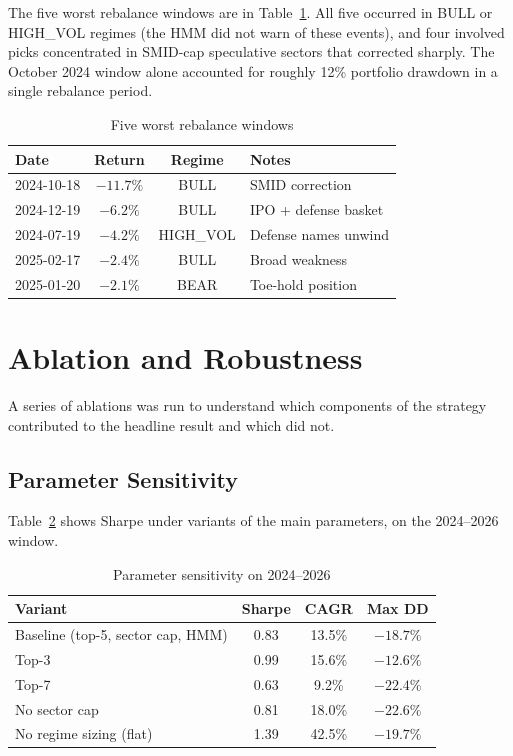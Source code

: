 \documentclass[conference]{IEEEtran}
\begin{document}
The five worst rebalance windows are in Table~\ref{tab:worst}. All five occurred in BULL or HIGH\_VOL regimes (the HMM did not warn of these events), and four involved picks concentrated in SMID-cap speculative sectors that corrected sharply. The October 2024 window alone accounted for roughly 12\% portfolio drawdown in a single rebalance period.

\begin{table}[htbp]
\caption{Five worst rebalance windows}
\label{tab:worst}
\centering
\footnotesize
\begin{tabular}{lccl}
\toprule
\textbf{Date} & \textbf{Return} & \textbf{Regime} & \textbf{Notes} \\
\midrule
2024-10-18 & $-11.7\%$ & BULL & SMID correction \\
2024-12-19 & $-6.2\%$  & BULL & IPO + defense basket \\
2024-07-19 & $-4.2\%$  & HIGH\_VOL & Defense names unwind \\
2025-02-17 & $-2.4\%$  & BULL & Broad weakness \\
2025-01-20 & $-2.1\%$  & BEAR & Toe-hold position \\
\bottomrule
\end{tabular}
\end{table}

\section{Ablation and Robustness}

A series of ablations was run to understand which components of the strategy contributed to the headline result and which did not.

\subsection{Parameter Sensitivity}

Table~\ref{tab:sensitivity} shows Sharpe under variants of the main parameters, on the 2024--2026 window.

\begin{table}[htbp]
\caption{Parameter sensitivity on 2024--2026}
\label{tab:sensitivity}
\centering
\begin{tabular}{lccc}
\toprule
\textbf{Variant} & \textbf{Sharpe} & \textbf{CAGR} & \textbf{Max DD} \\
\midrule
Baseline (top-5, sector cap, HMM) & 0.83 & 13.5\% & $-18.7\%$ \\
Top-3 & 0.99 & 15.6\% & $-12.6\%$ \\
Top-7 & 0.63 & 9.2\% & $-22.4\%$ \\
No sector cap & 0.81 & 18.0\% & $-22.6\%$ \\
No regime sizing (flat) & 1.39 & 42.5\% & $-19.7\%$ \\
\bottomrule
\end{tabular}
\end{table}
\end{document}
